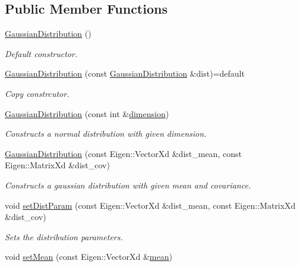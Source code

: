 \subsection*{Public Member Functions}
\begin{DoxyCompactItemize}
\item 
\hyperlink{classrefill_1_1GaussianDistribution_abca42c082cf99b5811ecf49139728f03}{Gaussian\+Distribution} ()
\begin{DoxyCompactList}\small\item\em Default constructor. \end{DoxyCompactList}\item 
\hyperlink{classrefill_1_1GaussianDistribution_aa747e7dbfa0b5bae0b0aea693436ae5a}{Gaussian\+Distribution} (const \hyperlink{classrefill_1_1GaussianDistribution}{Gaussian\+Distribution} \&dist)=default
\begin{DoxyCompactList}\small\item\em Copy constrcutor. \end{DoxyCompactList}\item 
\hyperlink{classrefill_1_1GaussianDistribution_ad90a420bb7d185f4463b07a7a1b3baf2}{Gaussian\+Distribution} (const int \&\hyperlink{classrefill_1_1GaussianDistribution_a43b275170074ef7ef38d93fb4f3e1e5a}{dimension})
\begin{DoxyCompactList}\small\item\em Constructs a normal distribution with given dimension. \end{DoxyCompactList}\item 
\hyperlink{classrefill_1_1GaussianDistribution_a2c7008059f8338e5b273637e7c13774c}{Gaussian\+Distribution} (const Eigen\+::\+Vector\+Xd \&dist\+\_\+mean, const Eigen\+::\+Matrix\+Xd \&dist\+\_\+cov)
\begin{DoxyCompactList}\small\item\em Constructs a gaussian distribution with given mean and covariance. \end{DoxyCompactList}\item 
void \hyperlink{classrefill_1_1GaussianDistribution_a2dc4f98174ef2ba08ccac80d2f85bb45}{set\+Dist\+Param} (const Eigen\+::\+Vector\+Xd \&dist\+\_\+mean, const Eigen\+::\+Matrix\+Xd \&dist\+\_\+cov)
\begin{DoxyCompactList}\small\item\em Sets the distribution parameters. \end{DoxyCompactList}\item 
void \hyperlink{classrefill_1_1GaussianDistribution_a54f8f02331947f515df30620bd6a706c}{set\+Mean} (const Eigen\+::\+Vector\+Xd \&\hyperlink{classrefill_1_1GaussianDistribution_aa7c74dd2350c3f56877ab759cb68ba8b}{mean})

\end{DoxyCompactItemize}
